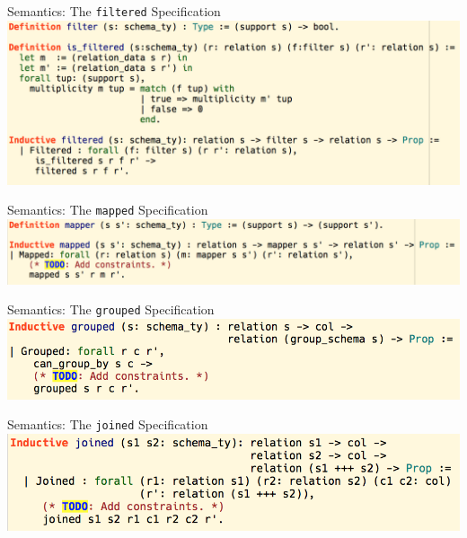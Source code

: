 \begin{frame}{Semantics: The \texttt{filtered} Specification}
\centering
  \includegraphics[scale=0.55]{CoqIDE/Semantics/filtered.png}
\end{frame}

\begin{frame}{Semantics: The \texttt{mapped} Specification}
\centering
  \includegraphics[scale=0.55]{CoqIDE/Semantics/mapped.png}
\end{frame}

\begin{frame}{Semantics: The \texttt{grouped} Specification}
\centering
  \includegraphics[scale=0.65]{CoqIDE/Semantics/grouped.png}
\end{frame}

\begin{frame}{Semantics: The \texttt{joined} Specification}
\centering
  \includegraphics[scale=0.65]{CoqIDE/Semantics/joined.png}
\end{frame}

